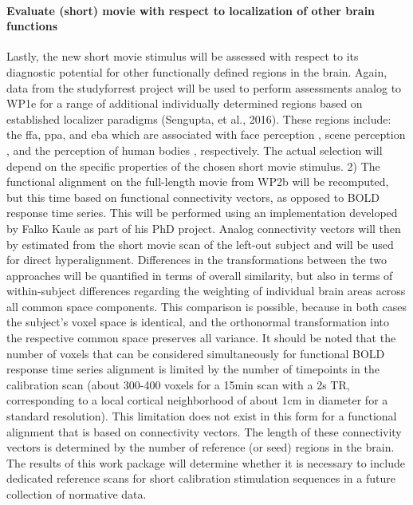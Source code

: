 

\paragraph{Evaluate (short) movie with respect to localization of other brain
functions}
%
Lastly, the new short movie stimulus will be assessed with respect to its
diagnostic potential for other functionally defined regions in the brain.
%
Again, data from the studyforrest project will be used to perform assessments
analog to WP1e for a range of additional individually determined regions based
on established localizer paradigms (Sengupta, et al., 2016).
%
These regions include: the \ac{ffa}, \ac{ppa}, and \ac{eba}  which are
associated with face perception \citep{kanwisher1997ffa,
pitcher2011occipitalfacearea}, scene perception \citep{epstein1998ppa}, and the
perception of human bodies \citep{downing2001bodyarea}, respectively.
%
The actual selection will depend on the specific properties of the chosen short
movie stimulus.
%
2) The functional alignment on the full-length movie from WP2b will be
recomputed, but this time based on functional connectivity vectors, as opposed
to BOLD response time series.
%
This will be performed using an implementation developed by Falko Kaule as part
of his PhD project.
%
Analog connectivity vectors will then by estimated from the short movie scan of
the left-out subject and will be used for direct hyperalignment.
%
Differences in the transformations between the two approaches will be quantified
in terms of overall similarity, but also in terms of within-subject differences
regarding the weighting of individual brain areas across all common space
components.
%
This comparison is possible, because in both cases the subject’s voxel space is
identical, and the orthonormal transformation into the respective common space
preserves all variance.
%
It should be noted that the number of voxels that can be considered
simultaneously for functional BOLD response time series alignment is limited by
the number of timepoints in the calibration scan (about 300-400 voxels for a
15min scan with a 2s TR, corresponding to a local cortical neighborhood of about
1cm in diameter for a standard resolution).
%
This limitation does not exist in
this form for a functional alignment that is based on connectivity vectors.
%
The
length of these connectivity vectors is determined by the number of reference
(or seed) regions in the brain.
%
The results of this work package will
determine whether it is necessary to include dedicated reference scans for short
calibration stimulation sequences in a future collection of normative data.


